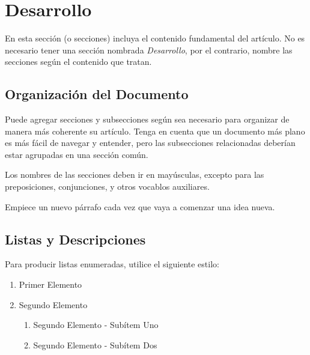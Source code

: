 \documentclass[a4paper,10pt,twocolumn]{article}
\begin{document}



\section{Desarrollo}\label{sec:dev}
  En esta sección (o secciones) incluya el contenido fundamental del artículo.
  No es necesario tener una sección nombrada \emph{Desarrollo}, por el contrario,
  nombre las secciones según el contenido que tratan.

	\subsection{Organización del Documento}\label{sub:results}
		Puede agregar secciones y subsecciones según sea necesario para organizar
		de manera más coherente su artículo. Tenga en cuenta que un documento más
		plano es más fácil de navegar y entender, pero las subsecciones relacionadas
		deberían estar agrupadas en una sección común.

		Los nombres de las secciones deben ir en mayúsculas, excepto para las
		preposiciones, conjunciones, y otros vocablos auxiliares.

		Empiece un nuevo párrafo cada vez que vaya a comenzar una idea nueva.

	\subsection{Listas y Descripciones}\label{sub:lists}
		Para producir listas enumeradas, utilice el siguiente estilo:
		\begin{enumerate}
			\item Primer Elemento
			\item Segundo Elemento
			\begin {enumerate}
				\item {Segundo Elemento - Subítem Uno}
				\item {Segundo Elemento - Subítem Dos}
			\end {enumerate}
		\end{enumerate}
\end{document}
